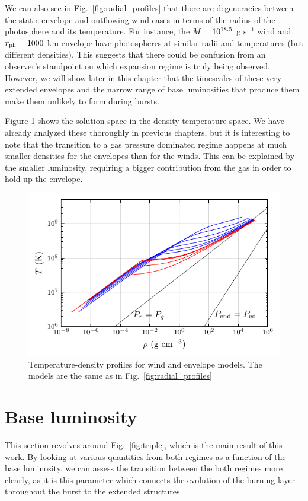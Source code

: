 \documentclass[../main.tex]{subfiles}
\begin{document}
We can also see in Fig.~\ref{fig:radial_profiles} that there are degeneracies between the static envelope and outflowing wind cases in terms of the radius of the photosphere and its temperature. For instance, the $\dot{M}=10^{18.5}$ g s$^{-1}$ wind and $r_\text{ph}=1000$ km envelope have photospheres at similar radii and temperatures (but different densities). This suggests that there could be confusion from an observer's standpoint on which expansion regime is truly being observed. However, we will show later in this chapter that the timescales of these very extended envelopes and the narrow range of base luminosities that produce them make them unlikely to form during bursts. 

Figure \ref{fig:rho_T} shows the solution space in the density-temperature space. We have already analyzed these thoroughly in previous chapters, but it is interesting to note that the transition to a gas pressure dominated regime happens at much smaller densities for the envelopes than for the winds. This can be explained by the smaller luminosity, requiring a bigger contribution from the gas in order to hold up the envelope.

\begin{figure}[htb!]
    \centering
    \includegraphics{figures/rho_T.pdf}
    \caption[Temperature-density profiles of winds and envelopes]{Temperature-density profiles for wind and envelope models. The models are the same as in Fig.~\ref{fig:radial_profiles}}
    \label{fig:rho_T}
\end{figure}

\section{Base luminosity}\label{sec:compare_Lb}
This section revolves around Fig.~\ref{fig:triple}, which is the main result of this work. By looking at various quantities from both regimes as a function of the base luminosity, we can assess the transition between the both regimes more clearly, as it is this parameter which connects the evolution of the burning layer throughout the burst to the extended structures. 
\end{document}
